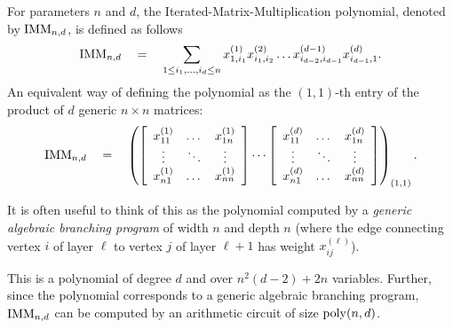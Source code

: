 For parameters $n$ and $d$, the Iterated-Matrix-Multiplication polynomial, denoted by $\mathrm{IMM}_{n,d}$, is defined as follows
$$
\mathrm{IMM}_{n,d} \quad = \quad \sum_{1\leq i_1,\dots, i_d\leq n} x_{1,i_1}^{(1)}x_{i_1,i_2}^{(2)}\dots x_{i_{d-2},i_{d-1}}^{(d-1)}x_{i_{d-1},1}^{(d)}.
$$
An equivalent way of defining the polynomial as the $(1,1)$-th entry of the product of $d$ generic $n\times n$ matrices:
$$
\mathrm{IMM}_{n,d} \quad = \quad \left(\left[\begin{array}{ccc} x_{11}^{(1)} & \dots & x_{1n}^{(1)}\\ \vdots & \ddots & \vdots \\ x_{n1}^{(1)} & \dots & x_{nn}^{(1)}\end{array}\right] \cdots \left[\begin{array}{ccc} x_{11}^{(d)} & \dots & x_{1n}^{(d)}\\ \vdots & \ddots & \vdots \\ x_{n1}^{(d)} & \dots & x_{nn}^{(d)}\end{array}\right]\right)_{(1,1)}.
$$

It is often useful to think of this as the polynomial computed by a \emph{generic algebraic branching program} of width $n$ and depth $n$ (where the edge connecting vertex $i$ of layer $\ell$ to vertex $j$ of layer $\ell+1$ has weight $x_{ij}^{(\ell)}$). 

This is a polynomial of degree $d$ and over $n^2(d-2) + 2n$ variables. Further, since the polynomial corresponds to a generic algebraic branching program, $\mathrm{IMM}_{n,d}$ can be computed by an arithmetic circuit of size $\mathrm{poly}(n,d)$. 



